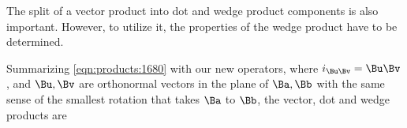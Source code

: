 The split of a vector product into dot and wedge product components is also important.
However, to utilize it, the properties of the wedge product have to be determined.

\index{\(\Ba \cross \Bb\)}
Summarizing \cref{eqn:products:1680} with our new operators, where \( i_{\Bu \Bv} = \Bu \Bv \), and \( \Bu, \Bv \) are orthonormal vectors in the plane of \( \Ba, \Bb \) with the same sense of the smallest rotation that takes \( \Ba \) to \( \Bb \), the vector, dot and wedge products are

